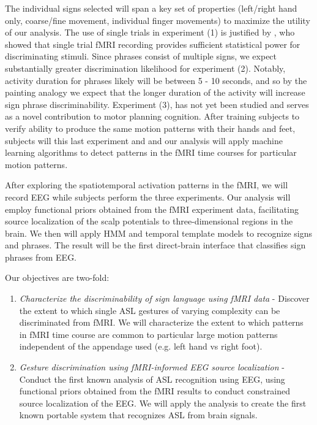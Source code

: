 \documentclass{proposal}
\begin{document}
The individual signs selected will span a key set of properties (left/right hand only, coarse/fine movement, individual finger movements) to maximize the utility of our analysis. The use of single trials in experiment (1) is justified by \cite{buckner1996dca}, who showed that single trial fMRI recording provides sufficient statistical power for discriminating stimuli. Since phrases consist of multiple signs, we expect substantially greater discrimination likelihood for experiment (2). Notably, activity duration for phrases likely will be between 5 - 10 seconds, and so by the painting analogy we expect that the longer duration of the activity will increase sign phrase discriminability. Experiment (3), has not yet been studied and serves as a novel contribution to motor planning cognition. After training subjects to verify ability to produce the same motion patterns with their hands and feet, subjects will this last experiment and and our analysis will apply machine learning algorithms to detect patterns in the fMRI time courses for particular motion patterns.

After exploring the spatiotemporal activation patterns in the fMRI, we will record EEG while subjects perform the three experiments. Our analysis will employ functional priors obtained from the fMRI experiment data, facilitating source localization of the scalp potentials to three-dimensional regions in the brain. We then will apply HMM and temporal template models to recognize signs and phrases. The result will be the first direct-brain interface that classifies sign phrases from EEG.

Our objectives are two-fold:
\begin{enumerate}
\item \textit{Characterize the discriminability of sign language using fMRI data} - Discover the extent to which single ASL gestures of varying complexity can be discriminated from fMRI. We will characterize the extent to which patterns in fMRI time course are common to particular large motion patterns independent of the appendage used (e.g. left hand vs right foot).
\item \textit{Gesture discrimination using fMRI-informed EEG source localization} - Conduct the first known analysis of ASL recognition using EEG, using functional priors obtained from the fMRI results to conduct constrained source localization of the EEG. We will apply the analysis to create the first known portable system that recognizes ASL from brain signals.
\end{enumerate}
\end{document}
